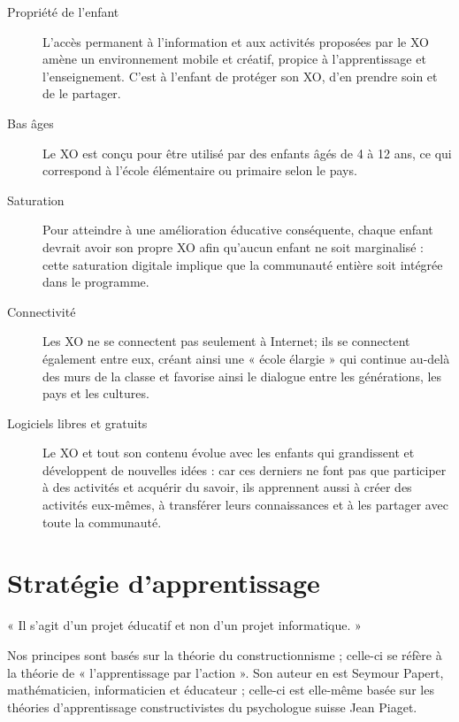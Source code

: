 \documentclass[12pt]{article}
\begin{document}
\begin{description}
\item[Propriété de l'enfant] L'accès permanent à l'information et aux
     activités proposées par le XO amène un environnement mobile et
     créatif, propice à l'apprentissage et l'enseignement. C'est à l'enfant
     de protéger son XO, d'en prendre soin et de le partager.
\item[Bas âges] Le XO est conçu pour être utilisé par des enfants âgés de 4 à
              12 ans, ce qui correspond à l'école élémentaire ou primaire
              selon le pays.
\item[Saturation] Pour atteindre à une amélioration éducative conséquente,
                chaque enfant devrait avoir son propre XO afin qu'aucun
                enfant ne soit marginalisé : cette saturation digitale
                implique que la communauté entière soit intégrée dans le
                programme.
\item[Connectivité] Les XO ne se connectent pas seulement à Internet; ils se
                  connectent également entre eux, créant ainsi une « école
                  élargie » qui continue au-delà des murs de la classe et
                  favorise ainsi le dialogue entre les générations, les
                  pays et les cultures.
\item[Logiciels libres et gratuits] Le XO et tout son contenu évolue avec les
     enfants qui grandissent et développent de nouvelles idées : car ces
     derniers ne font pas que participer à des activités et acquérir du
     savoir, ils apprennent aussi à créer des activités eux-mêmes, à
     transférer leurs connaissances et à les partager avec toute la
     communauté.
\end{description}
\section{Stratégie d'apprentissage}
\label{sec-2}



« Il s'agit d'un projet éducatif et non d'un projet informatique. »

Nos principes sont basés sur la théorie du constructionnisme ; celle-ci se
réfère à la théorie de « l'apprentissage par l'action ». Son auteur en est
Seymour Papert, mathématicien, informaticien et éducateur ; celle-ci est
elle-même basée sur les théories d'apprentissage constructivistes du
psychologue suisse Jean Piaget.
\end{document}
